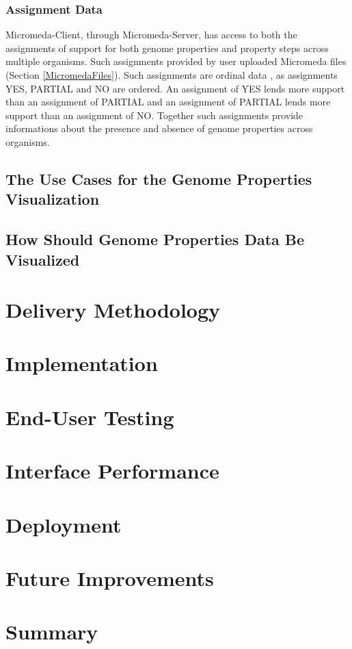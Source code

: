 \subsubsection{Assignment Data}

Micromeda-Client, through Micromeda-Server, has access to both the assignments of support for both genome properties and property steps across multiple organisms. Such assignments provided by user uploaded Micromeda files (Section \ref{MicromedaFiles}). Such assignments are ordinal data \cite{richardson2018genome,agresti2010analysis}, as assignments YES, PARTIAL and NO are ordered. An assignment of YES lends more support than an assignment of PARTIAL and an assignment of PARTIAL lends more support than an assignment of NO. Together such assignments provide informations about the presence and absence of genome properties across organisms.

\subsection{The Use Cases for the Genome Properties Visualization}

\subsection{How Should Genome Properties Data Be Visualized}

\section{Delivery Methodology}

\section{Implementation}

\section{End-User Testing}

\section{Interface Performance}

\section{Deployment}

\section{Future Improvements} \label{client-improvements}

\section{Summary} 